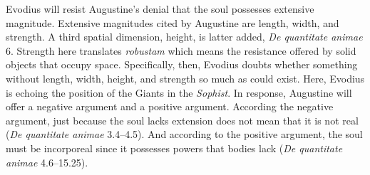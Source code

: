 \documentclass[12pt]{article}
\begin{document}
Evodius will resist Augustine’s denial that the soul possesses extensive magnitude. Extensive magnitudes cited by Augustine are length, width, and strength. A third spatial dimension, height, is latter added, \emph{De quantitate animae} 6. Strength here translates \emph{robustam} which means the resistance offered by solid objects that occupy space. Specifically, then, Evodius doubts whether something without length, width, height, and strength so much as could exist. 
Here, Evodius is echoing the position of the Giants in the \emph{Sophist}. %
In response, Augustine will offer a negative argument and a positive argument. According the negative argument, just because the soul lacks extension does not mean that it is not real (\emph{De quantitate animae} 3.4–4.5). And according to the positive argument, the soul must be incorporeal since it possesses powers that bodies lack (\emph{De quantitate animae} 4.6–15.25).
\end{document}
